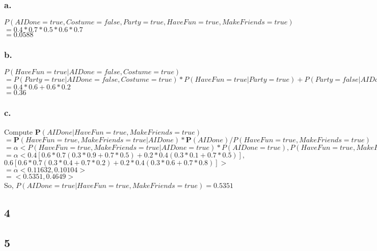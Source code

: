 \documentclass{article}
\begin{document}
            \subsubsection{a.}
                \par $P(AIDone=true,Costume=false,Party=true,HaveFun=true,MakeFriends=true)$
                \\$= 0.4*0.7*0.5*0.6*0.7$
                \\$= 0.0588$
            \subsubsection{b.}
                \par $P(HaveFun=true|AIDone=false,Costume=true)$
                \\$= P(Party=true|AIDone=false,Costume=true)*P(HaveFun=true|Party=true)+P(Party=false|AIDone=false,Costume=true)*P(HaveFun=true|Party=false)$
                \\$= 0.4*0.6+0.6*0.2$
                \\$= 0.36$
            \subsubsection{c.}
                \par Compute \textbf{P}$(AIDone|HaveFun=true,MakeFriends=true)$
                \\$= \textbf{P}(HaveFun=true,MakeFriends=true|AIDone)*\textbf{P}(AIDone)/P(HaveFun=true, MakeFriends=true)$
                \\$= \alpha<P(HaveFun=true,MakeFriends=true|AIDone=true)*P(AIDone=true),P(HaveFun=true,MakeFriends=true|AIDone=false)*P(AIDone=false)>$
                \\$= \alpha<0.4[0.6*0.7(0.3*0.9+0.7*0.5)+0.2*0.4(0.3*0.1+0.7*0.5)],$
                \\$0.6[0.6*0.7(0.3*0.4+0.7*0.2)+0.2*0.4(0.3*0.6+0.7*0.8)]>$
                \\$= \alpha<0.11632,0.10104>$
                \\$= <0.5351, 0.4649>$
                \\So, $P(AIDone=true|HaveFun=true,MakeFriends=true)=0.5351$
        \subsection{4}
        \subsection{5}
\end{document}
